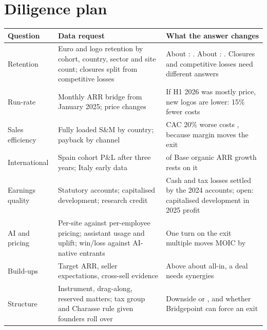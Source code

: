 \section{Diligence plan}
\begin{table}[H]
\vspace{-4pt}
\tbl
\begin{tabularx}{\textwidth}{@{}P{2.3cm}LP{6.4cm}@{}}
\toprule
Question & Data request & What the answer changes \\
\midrule
Retention & Euro and logo retention by cohort, country, sector and site count; closures split from competitive losses & About : . About : . Closures and competitive losses need different answers \\
Run-rate & Monthly ARR bridge from January 2025; price changes & If H1 2026 was mostly price, new logos are lower: 15\% fewer costs  \\
Sales efficiency & Fully loaded S\&M by country; payback by channel & CAC 20\% worse costs , because margin moves the exit \\
International & Spain cohort P\&L after three years; Italy early data &  of Base organic ARR growth rests on it \\
Earnings quality & Statutory accounts; capitalised development; research credit & Cash and tax losses settled by the 2024 accounts; open: capitalised development in 2025 profit \\
AI and pricing & Per-site against per-employee pricing; assistant usage and uplift; win/loss against AI-native entrants & One turn on the exit multiple moves MOIC by  \\
Build-ups & Target ARR, seller expectations, cross-sell evidence & Above about  all-in, a deal needs synergies \\
Structure & Instrument, drag-along, reserved matters; tax group and Charasse rule given founders roll over & Downside  or , and whether Bridgepoint can force an exit \\
\bottomrule
\end{tabularx}
\end{table}
\vspace{-6pt}


